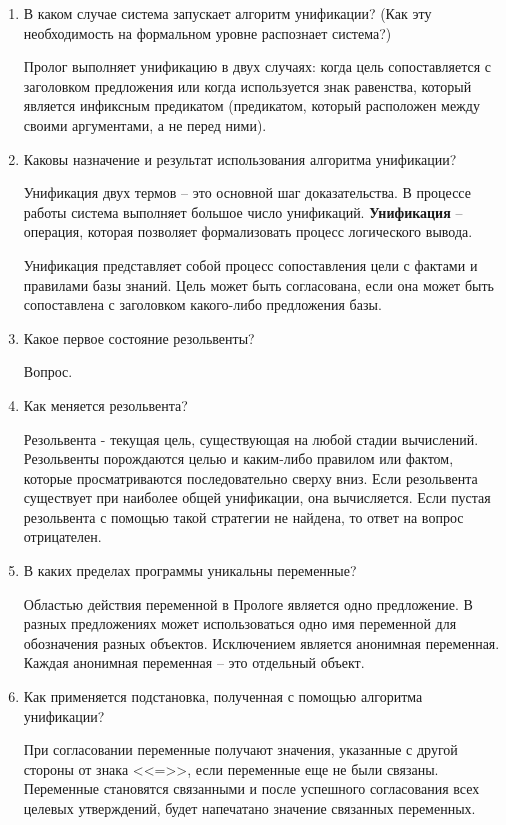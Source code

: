 \documentclass[a4paper,14pt]{extreport} %
\begin{document}
\begin{enumerate} 

\item В каком случае система запускает алгоритм унификации? (Как эту необходимость на формальном уровне распознает система?)

Пролог выполняет унификацию в двух случаях: когда цель сопоставляется с заголовком предложения или когда используется знак равенства, который является инфиксным предикатом (предикатом, который расположен между своими аргументами, а не перед ними).

\item Каковы назначение и результат использования алгоритма унификации? 

Унификация двух термов -- это основной шаг доказательства. В процессе работы система выполняет большое число унификаций.
\textbf{Унификация} -- операция, которая позволяет формализовать процесс логического вывода. 

Унификация представляет собой процесс сопоставления цели с фактами и правилами базы знаний. Цель может быть согласована, если она может быть сопоставлена с заголовком какого-либо предложения базы.

\item Какое первое состояние резольвенты?

Вопрос. 

\item Как меняется резольвента?

Резольвента - текущая цель, существующая на любой стадии вычислений. Резольвенты порождаются целью и каким-либо правилом или фактом, которые просматриваются последовательно сверху вниз. Если резольвента существует при наиболее общей унификации, она вычисляется. Если пустая резольвента с помощью такой стратегии не найдена, то ответ на вопрос отрицателен.

\item В каких пределах программы уникальны переменные? 

Областью действия переменной в Прологе является одно предложение. В разных предложениях может использоваться одно имя переменной для обозначения разных объектов. Исключением является анонимная переменная. Каждая анонимная переменная -- это отдельный объект.

\item Как применяется подстановка, полученная с помощью алгоритма унификации?

При согласовании переменные получают значения, указанные с другой стороны от знака <<=>>, если переменные еще не были связаны. Переменные становятся связанными и после успешного согласования всех целевых утверждений, будет напечатано значение связанных переменных.


\end{enumerate}
\end{document}
